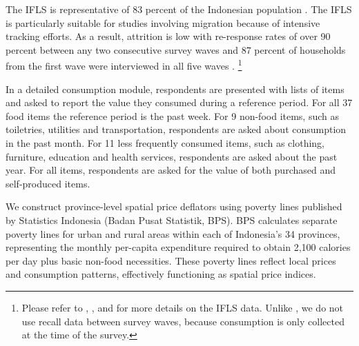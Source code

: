 \documentclass[12pt]{article}
\begin{document}
The IFLS is representative of 83 percent of the Indonesian population \citep{strauss2004third}. The IFLS is particularly suitable for studies involving migration because of intensive tracking efforts. As a result, attrition is low with re-response rates of over 90 percent between any two consecutive survey waves and 87 percent of households from the first wave were interviewed in all five waves \citep{straussFifthWaveIndonesia2016}.%
\footnote{Please refer to \cite{kleemansLabourMarketResponses2018}, \cite{hamoryReevaluatingAgriculturalProductivity2021}, and \cite{kleemansMigrationChoiceRisk} for more details on the IFLS data. Unlike \cite{hamoryReevaluatingAgriculturalProductivity2021}, we do not use recall data between survey waves, because consumption is only collected at the time of the survey.}

In a detailed consumption module, respondents are presented with lists of items and asked to report the value they consumed during a reference period. For all 37 food items the reference period is the past week. For 9 non-food items, such as toiletries, utilities and transportation, respondents are asked about consumption in the past month. For 11 less frequently consumed items, such as clothing, furniture, education and health services,  respondents are asked about the past year. For all items, respondents are asked for the value of both purchased and self-produced items. 

We construct province-level spatial price deflators using poverty lines published by Statistics Indonesia (Badan Pusat Statistik, BPS). 
BPS calculates separate poverty lines for urban and rural areas within each of Indonesia's 34 provinces, representing the monthly per-capita expenditure required to obtain 2,100 calories per day plus basic non-food necessities. 
These poverty lines reflect local prices and consumption patterns, effectively functioning as spatial price indices.
\end{document}
